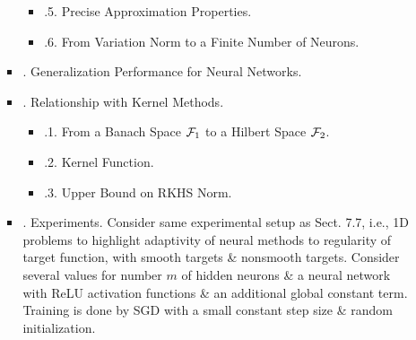 \documentclass{article}
\begin{document}
\begin{enumerate}
\begin{itemize}
\begin{itemize}
\begin{itemize}
				\item {.5. Precise Approximation Properties.}
				\item {.6. From Variation Norm to a Finite Number of Neurons.}
			\end{itemize}
			\item {. Generalization Performance for Neural Networks.}
			\item {. Relationship with Kernel Methods.}
			\begin{itemize}
				\item {.1. From a Banach Space ${\cal F}_1$ to a Hilbert Space ${\cal F}_2$.}
				\item {.2. Kernel Function.}
				\item {.3. Upper Bound on RKHS Norm.}
			\end{itemize}
			\item {. Experiments.} Consider same experimental setup as Sect. 7.7, i.e., 1D problems to highlight adaptivity of neural methods to regularity of target function, with smooth targets \& nonsmooth targets. Consider several values for number $m$ of hidden neurons \& a neural network with ReLU activation functions \& an additional global constant term. Training is done by SGD with a small constant step size \& random initialization.
			

\end{itemize}
\end{itemize}
\end{enumerate}
\end{document}
